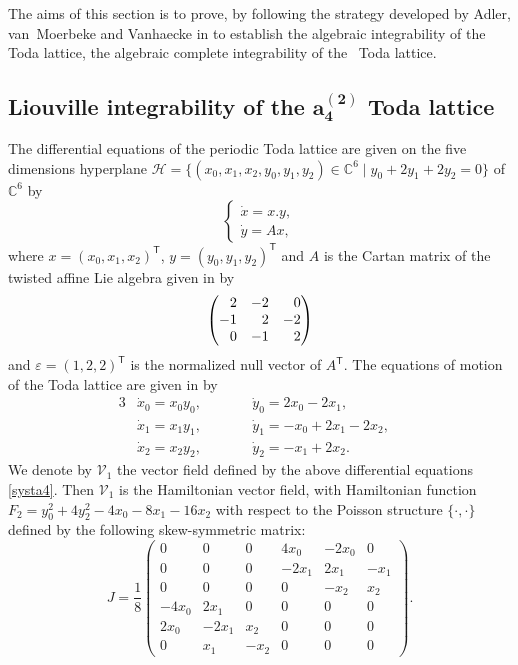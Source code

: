 \documentclass[10pt,a4paper]{amsart}
\numberwithin{equation}{section}
\begin{document}
The aims of this section is to prove, by following the strategy
developed by Adler, van~Moerbeke and Vanhaecke in \cite[Section~9.4]{al_Moer3} to establish the algebraic integrability of
the  Toda lattice, the algebraic complete
integrability of the~ Toda lattice.

\subsection[Liouville integrability of the a\_4\^{}(2) Toda lattice]{Liouville integrability of the $\boldsymbol{a_4^{(2)}}$ Toda lattice}

The differential equations of the periodic 
Toda lattice
 are given on the five dimensions hyperplane
 $\mathcal{H} =\big\{( x_0, x_1, x_2, y_0, y_1, y_2 )\in
\mathbb{C}^6 \mid y_0 + 2 y_1 + 2y_2 = 0 \big\}$ of $\mathbb{C}^6$ by
\[
 \begin{cases}
 \dot{x}=x.y,\\
 \dot{y}=Ax,
 \end{cases}\]
where $x=(x_0,x_1,x_2)^{\mathsf{T}}$,
$y=(y_0,y_1,y_2)^{\mathsf{T}}$ and $A$ is the Cartan matrix
of the twisted affine Lie algebra  given in
\cite{al_Moer3} by
\[
 \begin{pmatrix}
 \hphantom{-} 2 & -2 & \hphantom{-}0 \\
 -1 & \hphantom{-}2 & -2 \\
 \hphantom{-}0 & -1 & \hphantom{-}2 \\
 \end{pmatrix}
\]
and $\varepsilon=(1,2,2)^{\mathsf{T}}$ is the
normalized null vector of $A^{\mathsf{T}}$.
 The equations of motion of the  Toda lattice are given
 in \cite{al_Moer3} by
\begin{alignat}{3}
& \dot{x}_0=x_0y_0, \qquad && \dot{y}_0=2x_0-2x_1, & \nonumber\\
& \dot{x}_1=x_1y_1, \qquad && \dot{y}_1=-x_0+2x_1-2x_2, &\nonumber\\
& \dot{x}_2=x_2y_2, \qquad && \dot{y}_2=-x_1 + 2x_2. & \label{systa4}
\end{alignat}
We denote by $\mathcal{V}_1$ the vector field defined by the above
differential equations \eqref{systa4}. Then $\mathcal{V}_1$ is the
Hamiltonian vector field, with Hamiltonian function $ F_2=y_0^2
+ 4y_2^2-4x_0-8x_1-16x_2 $ with respect to the Poisson
structure $\{\cdot,\cdot\}$ defined by the following
skew-symmetric matrix:
\begin{equation}\label{matrij2}
 J=\frac{1}{8}\begin{pmatrix}
 0 & 0 & 0 & 4x_0 & -2x_0 & 0 \\
 0 & 0 & 0 & -2x_1 & 2x_1 & -x_1 \\
 0 & 0 & 0 & 0 & -x_2 & x_2 \\
 -4x_0 & 2x_1 & 0 & 0 & 0 & 0 \\
 2x_0 & -2x_1 & x_2 & 0 & 0 & 0 \\
 0 & x_1 & -x_2 & 0 & 0 & 0
 \end{pmatrix}.
\end{equation}
\end{document}
